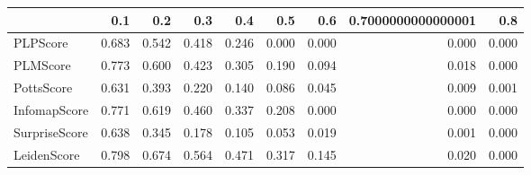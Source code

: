 \begin{tabular}{lrrrrrrrr}
\toprule
{} &   0.1 &   0.2 &   0.3 &   0.4 &   0.5 &   0.6 & 0.7000000000000001 &   0.8 \\
\midrule
PLPScore      & 0.683 & 0.542 & 0.418 & 0.246 & 0.000 & 0.000 &              0.000 & 0.000 \\
PLMScore      & 0.773 & 0.600 & 0.423 & 0.305 & 0.190 & 0.094 &              0.018 & 0.000 \\
PottsScore    & 0.631 & 0.393 & 0.220 & 0.140 & 0.086 & 0.045 &              0.009 & 0.001 \\
InfomapScore  & 0.771 & 0.619 & 0.460 & 0.337 & 0.208 & 0.000 &              0.000 & 0.000 \\
SurpriseScore & 0.638 & 0.345 & 0.178 & 0.105 & 0.053 & 0.019 &              0.001 & 0.000 \\
LeidenScore   & 0.798 & 0.674 & 0.564 & 0.471 & 0.317 & 0.145 &              0.020 & 0.000 \\
\bottomrule
\end{tabular}
